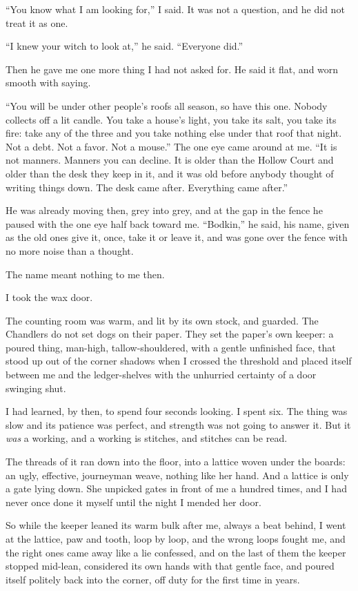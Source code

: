 ``You know what I am looking for,'' I said. It was not a question, and he did not treat it as one.

``I knew your witch to look at,'' he said. ``Everyone did.''

Then he gave me one more thing I had not asked for. He said it flat, and worn smooth with saying.

``You will be under other people's roofs all season, so have this one. Nobody collects off a lit candle. You take a house's light, you take its salt, you take its fire: take any of the three and you take nothing else under that roof that night. Not a debt. Not a favor. Not a mouse.'' The one eye came around at me. ``It is not manners. Manners you can decline. It is older than the Hollow Court and older than the desk they keep in it, and it was old before anybody thought of writing things down. The desk came after. Everything came after.''

He was already moving then, grey into grey, and at the gap in the fence he paused with the one eye half back toward me. ``Bodkin,'' he said, his name, given as the old ones give it, once, take it or leave it, and was gone over the fence with no more noise than a thought.

The name meant nothing to me then.

I took the wax door.

\scenebreak

The counting room was warm, and lit by its own stock, and guarded. The Chandlers do not set dogs on their paper. They set the paper's own keeper: a poured thing, man-high, tallow-shouldered, with a gentle unfinished face, that stood up out of the corner shadows when I crossed the threshold and placed itself between me and the ledger-shelves with the unhurried certainty of a door swinging shut.

I had learned, by then, to spend four seconds looking. I spent six. The thing was slow and its patience was perfect, and strength was not going to answer it. But it \emph{was} a working, and a working is stitches, and stitches can be read.

The threads of it ran down into the floor, into a lattice woven under the boards: an ugly, effective, journeyman weave, nothing like her hand. And a lattice is only a gate lying down. She unpicked gates in front of me a hundred times, and I had never once done it myself until the night I mended her door.

So while the keeper leaned its warm bulk after me, always a beat behind, I went at the lattice, paw and tooth, loop by loop, and the wrong loops fought me, and the right ones came away like a lie confessed, and on the last of them the keeper stopped mid-lean, considered its own hands with that gentle face, and poured itself politely back into the corner, off duty for the first time in years.

